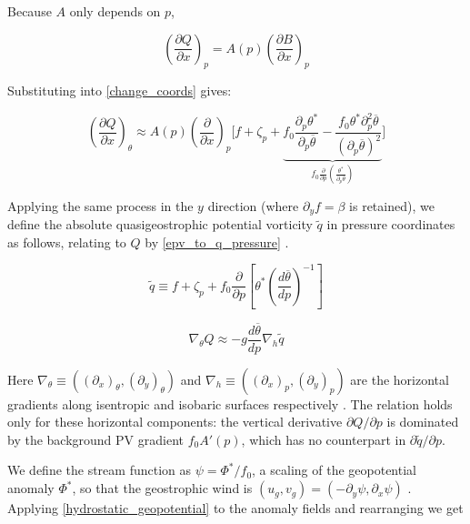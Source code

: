 \documentclass{article}
\begin{document}
Because $A$ only depends on $p$,

\begin{equation}
    \left(\frac{\partial Q}{\partial x} \right)_p = A(p) \left(\frac{\partial B}{\partial x}\right)_p
\end{equation}

Substituting into \cref{change_coords} gives:

\begin{equation}\label{dQ_dz_theta}
    \left(\frac{\partial Q}{\partial x}\right)_\theta \approx A(p) \left( \frac{\partial}{\partial x}\right)_p \Bigg[ f + \zeta_p + \underbrace{f_0 \frac{\partial _p \theta^*}{\partial _p \overline\theta} -\frac{ f_0 \theta ^*\partial_p^2 \overline\theta}{\left(\partial_p \overline\theta\right)^2}}_{ \displaystyle f_0 \frac{\partial}{\partial p}\left(\frac{\theta^*}{\partial_p \overline\theta}\right)}\Bigg]
\end{equation}

Applying the same process in the $y$ direction (where $\partial_y f = \beta$ is retained), we define the absolute quasigeostrophic potential vorticity $\tilde q$ in pressure coordinates as follows, relating to $Q$ by \cref{epv_to_q_pressure} \cite{Hoskins1985}.

\begin{equation}\label{qgpv_pressure}
    \tilde q \equiv f + \zeta_p + f_0 \frac{\partial }{\partial p} \left[ \theta^* \left(\frac{d \overline \theta}{d p}\right)^{-1}\right]
\end{equation}

\begin{equation}\label{epv_to_q_pressure}
    \nabla_\theta Q \approx -g \frac{d \overline \theta}{d p} \nabla _h \tilde q
\end{equation}

Here $\nabla_\theta \equiv \left((\partial_x)_\theta, (\partial_y)_\theta\right)$ and $\nabla_h \equiv \left((\partial_x)_p, (\partial_y)_p\right)$ are the horizontal gradients along isentropic and isobaric surfaces respectively \cite{Hoskins1985}.
The relation holds only for these horizontal components: the vertical derivative $\partial Q / \partial p$ is dominated by the background PV gradient $f_0 A'(p)$, which has no counterpart in $\partial \tilde q / \partial p$.

We define the stream function as $\psi=\Phi^* / f_0$, a scaling of the geopotential anomaly $\Phi^*$, so that the geostrophic wind is $(u_g, v_g) = (-\partial_y \psi, \partial_x \psi)$ \cite{Hoskins1985,Vallis2017}.
Applying \cref{hydrostatic_geopotential} to the anomaly fields and rearranging we get \cite{Hoskins1985}
\end{document}
